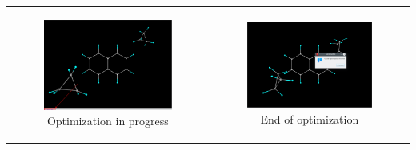 \documentclass[10pt]{article}
\begin{document}
\begin{enumerate}
\begin{center}
\begin{tabular}{cc}
\begin{minipage}{.48\linewidth}
\begin{figure}[H]
\begin{center}
\includegraphics[width=.8\linewidth]{damqt320_epic_3_b.png}
\end{center}
\caption{{Optimization in progress} \label{fig:A6_3}}
\end{figure}
\end{minipage}
&
\begin{minipage}{.48\linewidth}
\begin{figure}[H]
\begin{center}
\includegraphics[width=.8\linewidth]{damqt320_epic_4.png}
\end{center}
\caption{{End of optimization}\label{fig:A6_4}}
\end{figure}
\end{minipage}
\end{tabular}
\end{center}


\end{enumerate}
\end{document}
